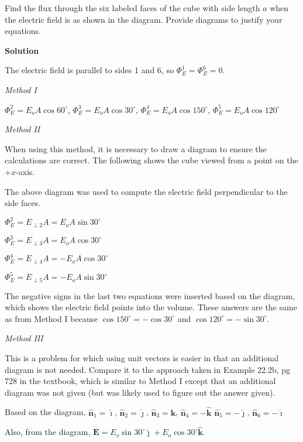 \documentclass{article}
\newcommand{\ihat}[0]{\hat{\boldsymbol{\imath}}}
\newcommand{\jhat}[0]{\hat{\boldsymbol{\jmath}}}
\newcommand{\khat}[0]{\hat{\boldsymbol{k}}}
\begin{document}


Find the flux through the six labeled faces of the cube with side length $a$ when the electric field is as shown in the diagram. Provide diagrams to justify your equations.

\ifsolutions
\textbf{Solution}

The electric field is parallel to sides 1 and 6, so $\Phi_E^1=\Phi_E^6=0$.

\emph{Method I}



$\Phi_E^2=E_oA\cos 60^\circ$, $\Phi_E^3=E_oA\cos 30^\circ$, $\Phi_E^4=E_oA\cos 150^\circ$, $\Phi_E^5=E_oA\cos 120^\circ$

\emph{Method II}

When using this method, it is necessary to draw a diagram to ensure the calculations are correct. The following shows the cube viewed from a point on the $+x$-axis.



The above diagram was used to compute the electric field perpendicular to the side faces.

$\Phi_E^2=E_{\perp 2}A=E_oA\sin 30^\circ$

$\Phi_E^3=E_{\perp 3}A=E_oA\cos 30^\circ$

$\Phi_E^4=E_{\perp 4}A=-E_oA\cos 30^\circ$

$\Phi_E^5=E_{\perp 5}A=-E_oA\sin 30^\circ$

The negative signs in the last two equations were inserted based on the diagram, which shows the electric field points into the volume. These answers are the same as from Method I because $\cos 150^\circ = -\cos 30^\circ$ and $\cos 120^\circ = -\sin 30^\circ$.

\emph{Method III}

This is a problem for which using unit vectors is easier in that an additional diagram is not needed. Compare it to the approach taken in Example 22.2b, pg 728 in the textbook, which is similar to Method I except that an additional diagram was not given (but was likely used to figure out the answer given).

Based on the diagram, $\hat{\mathbf{n}}_1=\ihat$, $\hat{\mathbf{n}}_2=\jhat$, $\hat{\mathbf{n}}_3=\khat$, $\hat{\mathbf{n}}_4=-\khat$
$\hat{\mathbf{n}}_5=-\jhat$, $\hat{\mathbf{n}}_6=-\ihat$

Also, from the diagram, $\mathbf{E}=E_o\sin30^\circ\jhat+E_o\cos30^\circ\khat$.
\end{document}
